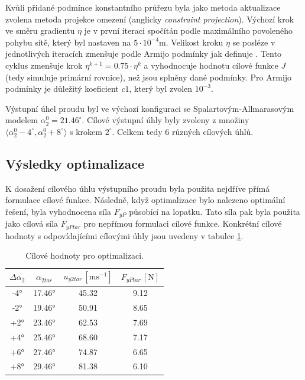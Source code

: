 Kvůli přidané podmínce konstantního průřezu byla jako metoda aktualizace zvolena metoda projekce omezení (anglicky \textit{constraint projection}). Výchozí krok ve směru gradientu $ \eta $ je v první iteraci spočítán podle maximálního povoleného pohybu sítě, který byl nastaven na $ 5\cdot10^{-4} \mathrm{m}$. Velikost kroku $ \eta $ se posléze v jednotlivých iteracích zmenšuje podle Armijo podmínky jak definuje \cite{nocedal1999numerical}. Tento cyklus zmenšuje krok $ \eta^{k+1}=0.75\cdot\eta^{k} $ a vyhodnocuje hodnotu cílové funkce $ J $ (tedy simuluje primární rovnice), než jsou splněny dané podmínky. Pro Armijo podmínky je důležitý koeficient $ c1 $, který byl zvolen $ 10^{-3} $.

Výstupní úhel proudu byl ve výchozí konfiguraci se Spalartovým-Allmarasovým modelem $ \alpha_{2}^{0}=21.46^{\circ} $. Cílové výstupní úhly byly zvoleny z množiny $ \langle \alpha_{2}^{0}-4^{\circ}, \alpha_{2}^{0}+8^{\circ} \rangle $ s krokem $ 2^{\circ} $. Celkem tedy 6 různých cílových úhlů.

\subsection{Výsledky optimalizace} \label{sec:vysledky_opt}
K dosažení cílového úhlu výstupního proudu byla použita nejdříve přímá formulace cílové funkce. Následně, když optimalizace bylo nalezeno optimální řešení, byla vyhodnocena síla $ F_{yP} $ působící na lopatku. Tato síla pak byla použita jako cílová síla $ F_{yPtar} $ pro nepřímou formulaci cílové funkce. Konkrétní cílové hodnoty s odpovídajícími cílovými úhly jsou uvedeny v tabulce \ref{tab:cilove_hodnoty}.

\begin{table}[H]
	\begin{ctucolortab}
		\begin{tabular}{c|c||c|c}
			
			$ \Delta\alpha_{2} $ &$ \alpha_{2tar} $ & $ u_{y2tar}\,[\mathrm{ms^{-1}}] $ & $ F_{yPtar}\,[\mathrm{N}] $ \\
			\hline
			-4° & 17.46° & 45.32 & 9.12 \\
			
			-2° & 19.46° & 50.91 & 8.65 \\
			
			+2° & 23.46° & 62.53 & 7.69 \\
			
			+4° & 25.46° & 68.60 & 7.17 \\
			
			+6° & 27.46° & 74.87 & 6.65 \\
			
			+8° & 29.46° & 81.38 & 6.10 \\
			
		\end{tabular}
	\end{ctucolortab}
	\caption{Cílové hodnoty pro optimalizaci.}
	\label{tab:cilove_hodnoty}
\end{table}

